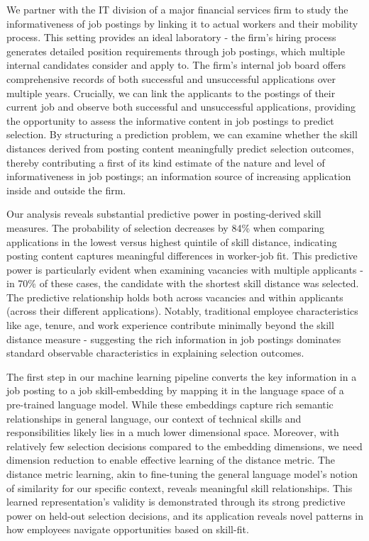 \documentclass[12pt]{article}
\begin{document}
We partner with the IT division of a major financial services firm to study the informativeness of job postings by linking it to actual workers and their mobility process. This setting provides an ideal laboratory - the firm's hiring process generates detailed position requirements through job postings, which multiple internal candidates consider and apply to. The firm's internal job board offers comprehensive records of both successful and unsuccessful applications over multiple years. Crucially, we can link the applicants to the postings of their current job and observe both successful and unsuccessful applications, providing the opportunity to assess the informative content in job postings to predict selection. By structuring a prediction problem, we can examine whether the skill distances derived from posting content meaningfully predict selection outcomes, thereby contributing a first of its kind estimate of the nature and level of informativeness in job postings; an information source of increasing application inside and outside the firm.

Our analysis reveals substantial predictive power in posting-derived skill measures. The probability of selection decreases by 84\% when comparing applications in the lowest versus highest quintile of skill distance, indicating posting content captures meaningful differences in worker-job fit. This predictive power is particularly evident when examining vacancies with multiple applicants - in 70\% of these cases, the candidate with the shortest skill distance was selected. The predictive relationship holds both across vacancies and within applicants (across their different applications). Notably, traditional employee characteristics like age, tenure, and work experience contribute minimally beyond the skill distance measure - suggesting the rich information in job postings dominates standard observable characteristics in explaining selection outcomes.


The first step in our machine learning pipeline converts the key information in a job posting to a job skill-embedding by mapping it in the language space of a pre-trained language model. While these embeddings capture rich semantic relationships in general language, our context of technical skills and responsibilities likely lies in a much lower dimensional space. Moreover, with relatively few selection decisions compared to the embedding dimensions, we need dimension reduction to enable effective learning of the distance metric. The distance metric learning, akin to fine-tuning the general language model's notion of similarity for our specific context, reveals meaningful skill relationships. This learned representation's validity is demonstrated through its strong predictive power on held-out selection decisions, and its application reveals novel patterns in how employees navigate opportunities based on skill-fit.
\end{document}
